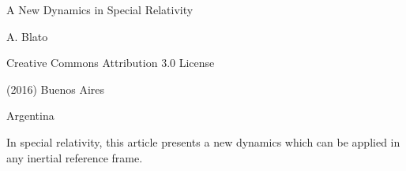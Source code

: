 \documentclass[10pt,fleqn]{article}
\begin{document}
\begin{center}

{\fontsize{10.98}{10.98}\selectfont \sc A New Dynamics in Special Relativity}

\bigskip \medskip

{A. Blato}

\bigskip \medskip

\small

Creative Commons Attribution 3.0 License

\smallskip

(2016) Buenos Aires

\medskip

Argentina

\smallskip

\bigskip \medskip

\parbox{72.00mm}{In special relativity, this article presents a new dynamics which can be applied in any inertial reference frame.}

\end{center}

\normalsize

\vspace{-1.20em}

\par {}

\bigskip \smallskip
\end{document}

